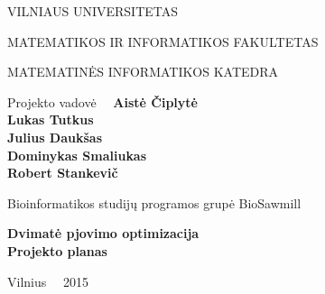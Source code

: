 \documentclass[a4paper,12pt]{article}
\begin{document}
\renewcommand{\cftdot}{.}	
\renewcommand{\cftsecleader}{\cftdotfill{\cftdotsep}}

\thispagestyle{empty} %


\begin{center}
 VILNIAUS UNIVERSITETAS 
 
MATEMATIKOS IR INFORMATIKOS FAKULTETAS

MATEMATINĖS INFORMATIKOS KATEDRA

\vspace{4cm}

Projekto vadovė \ \ \textbf{Aistė Čiplytė} \\
\textbf{Lukas Tutkus} \\
\textbf{Julius Daukšas} \\
\textbf{Dominykas Smaliukas} \\
\textbf{Robert Stankevič} \\

\vspace{0.2cm}

Bioinformatikos studijų programos grupė BioSawmill



\vspace{3cm}
\textbf{\Large Dvimatė pjovimo optimizacija}\\
\textbf{\Large Projekto planas}

\vfill

Vilnius \ \  2015
\end{center}



\clearpage

\tableofcontents
\clearpage
\end{document}
